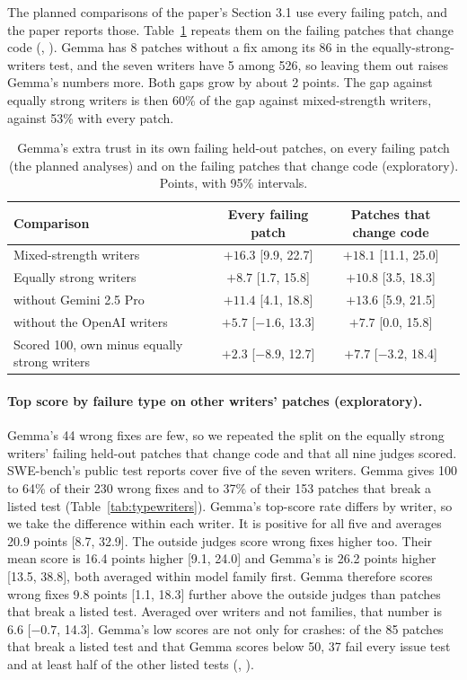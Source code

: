 \documentclass[10pt,letterpaper]{article}
\begin{document}
The planned comparisons of the paper's Section 3.1 use every failing patch, and the paper reports those.
Table~\ref{tab:codeonly} repeats them on the failing patches that change code
(, ). Gemma has 8 patches
without a fix among its 86 in the equally-strong-writers test, and the seven writers have 5 among 526, so leaving
them out raises Gemma's numbers more. Both gaps grow by about 2 points. The gap against equally strong writers is
then 60\% of the gap against mixed-strength writers, against 53\% with every patch.

\begin{table}[H]
\centering
\small
\caption{Gemma's extra trust in its own failing held-out patches, on every failing patch (the planned analyses) and
on the failing patches that change code (exploratory). Points, with 95\% intervals.}
\label{tab:codeonly}
\begin{tabular}{@{}lcc@{}}
\toprule
Comparison & Every failing patch & Patches that change code \\
\midrule
Mixed-strength writers & $+16.3$ [9.9, 22.7] & $+18.1$ [11.1, 25.0] \\
Equally strong writers & $+8.7$ [1.7, 15.8] & $+10.8$ [3.5, 18.3] \\
\quad without Gemini 2.5 Pro & $+11.4$ [4.1, 18.8] & $+13.6$ [5.9, 21.5] \\
\quad without the OpenAI writers & $+5.7$ [$-1.6$, 13.3] & $+7.7$ [0.0, 15.8] \\
Scored 100, own minus equally strong writers & $+2.3$ [$-8.9$, 12.7] & $+7.7$ [$-3.2$, 18.4] \\
\bottomrule
\end{tabular}
\end{table}

\paragraph{Top score by failure type on other writers' patches (exploratory).} Gemma's 44 wrong fixes are few, so we
repeated the split on the equally strong writers' failing held-out patches that change code and that all nine judges
scored. SWE-bench's public test reports cover five of the seven writers. Gemma gives 100 to 64\% of their 230 wrong
fixes and to 37\% of their 153 patches that break a listed test (Table~\ref{tab:typewriters}). Gemma's top-score rate
differs by writer, so we take the difference within each writer. It is positive for all five and averages 20.9 points
[8.7, 32.9]. The outside judges score wrong fixes higher too. Their mean score is 16.4 points higher [9.1, 24.0] and
Gemma's is 26.2 points higher [13.5, 38.8], both averaged within model family first. Gemma therefore scores wrong
fixes 9.8 points [1.1, 18.3] further above the outside judges than patches that break a listed test. Averaged over
writers and not families, that number is 6.6 [$-0.7$, 14.3]. Gemma's low scores are not only for crashes: of the 85
patches that break a listed test and that Gemma scores below 50, 37 fail every issue test and at least half of the
other listed tests (, ).
\end{document}
